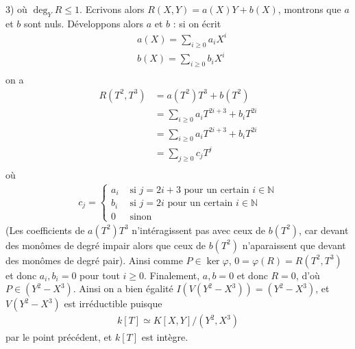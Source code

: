 \documentclass[11pt]{article}
\begin{document}
\begin{question}{3)}
        où $\deg_Y R \leq 1$. Ecrivons alors $R(X,Y) = a(X)Y + b(X)$, montrons que $a$ et $b$ sont nuls. Développons alors $a$ et $b$ : si on écrit 
        \begin{align*}
            &a(X) = \sum_{i \geq 0} a_i X^i \\
            &b(X) = \sum_{i \geq 0} b_i X^i \\
        \end{align*}
        on a 
        \begin{align*}
            R(T^2, T^3) &= a(T^2)T^3 + b(T^2) \\
            &= \sum_{i \geq 0} a_i T^{2i + 3} + b_i T^{2i} \\
            &= \sum_{i \geq 0} a_i T^{2i + 3} + b_i T^{2i} \\
            &= \sum_{j \geq 0} c_j T^j \\
        \end{align*}
        où
        \begin{align*}
            c_j =
            \begin{cases}
                a_i &\text{ si } j = 2i + 3 \text{ pour un certain } i \in \mathbb{N} \\
                b_i &\text{ si } j = 2i \text{ pour un certain } i \in \mathbb{N} \\
                0 & \text{ sinon}
            \end{cases}
        \end{align*}
        (Les coefficients de $a(T^2)T^3$ n'intéragissent pas avec ceux de $b(T^2)$, car devant des monômes de degré impair alors que ceux de $b(T^2)$ n'aparaissent que devant des monômes de degré pair). Ainsi comme $P \in \ker \varphi$, $0 = \varphi(R) = R(T^2, T^3)$ et donc $a_i, b_i = 0$ pour tout $i \geq 0$. Finalement, $a,b = 0$ et donc $R = 0$, d'où $P \in (Y^2 - X^3)$. Ainsi on a bien égalité $I(V(Y^2 - X^3)) = (Y^2 - X^3)$, et $V(Y^2 - X^3)$ est irréductible puisque
        \begin{align*}
            k[T] \simeq K[X,Y]/(Y^2 , X^3)
        \end{align*}
        par le point précédent, et $k[T]$ est intègre.
    \end{question}
\end{document}
